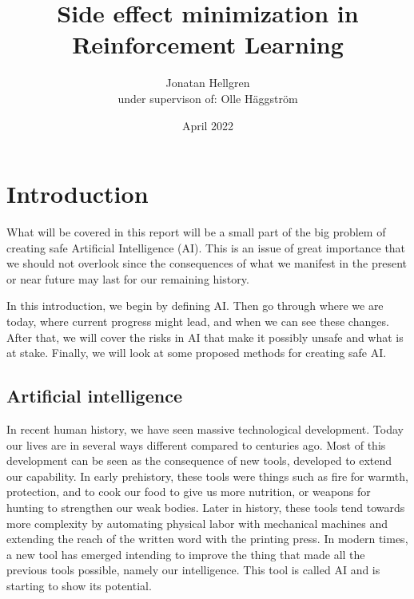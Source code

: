\documentclass[12pt,A4]{report}
\title{Side effect minimization in Reinforcement Learning}
\author{Jonatan Hellgren\\
under supervison of: Olle Häggström}
\date{April 2022}
\newcommand{\autobaj}{}
\theoremstyle{definition}
\begin{document}
\maketitle


\thispagestyle{empty}

\newpage
{}

\tableofcontents

\newpage
{}

% 

\chapter{Introduction}
What will be covered in this report will be a small part of the big problem of creating safe Artificial Intelligence (AI). This is an issue of great importance that we should not overlook since the consequences of what we manifest in the present or near future may last for our remaining history. 

In this introduction, we begin by defining AI. Then go through where we are today, where current progress might lead, and when we can see these changes. After that, we will cover the risks in AI that make it possibly unsafe and what is at stake. Finally, we will look at some proposed methods for creating safe AI. \autocite{Bostrom}


\section{Artificial intelligence}
In recent human history, we have seen massive technological development. Today our lives are in several ways different compared to centuries ago. Most of this development can be seen as the consequence of new tools, developed to extend our capability. In early prehistory, these tools were things such as fire for warmth, protection, and to cook our food to give us more nutrition, or weapons for hunting to strengthen our weak bodies. Later in history, these tools tend towards more complexity by automating physical labor with mechanical machines and extending the reach of the written word with the printing press. In modern times, a new tool has emerged intending to improve the thing that made all the previous tools possible, namely our intelligence. This tool is called AI and is starting to show its potential. 
\end{document}
